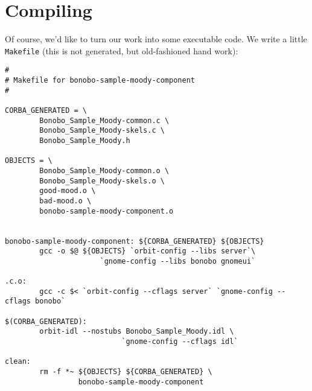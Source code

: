 \documentclass[final,10pt]{article}
\begin{document}
\section{Compiling}
Of course, we'd like to turn our work into some executable code. 
We write a little \verb|Makefile| (this is not generated, but
old-fashioned hand work):
\begin{verbatim}
#
# Makefile for bonobo-sample-moody-component
#

CORBA_GENERATED = \
        Bonobo_Sample_Moody-common.c \
        Bonobo_Sample_Moody-skels.c \
        Bonobo_Sample_Moody.h

OBJECTS = \
        Bonobo_Sample_Moody-common.o \
        Bonobo_Sample_Moody-skels.o \
        good-mood.o \
        bad-mood.o \
        bonobo-sample-moody-component.o 


bonobo-sample-moody-component: ${CORBA_GENERATED} ${OBJECTS}
        gcc -o $@ ${OBJECTS} `orbit-config --libs server`\ 
                      `gnome-config --libs bonobo gnomeui`

.c.o:   
        gcc -c $< `orbit-config --cflags server` `gnome-config --cflags bonobo` 

$(CORBA_GENERATED):
        orbit-idl --nostubs Bonobo_Sample_Moody.idl \ 
                           `gnome-config --cflags idl`

clean:
        rm -f *~ ${OBJECTS} ${CORBA_GENERATED} \
                 bonobo-sample-moody-component

\end{verbatim}
\end{document}
